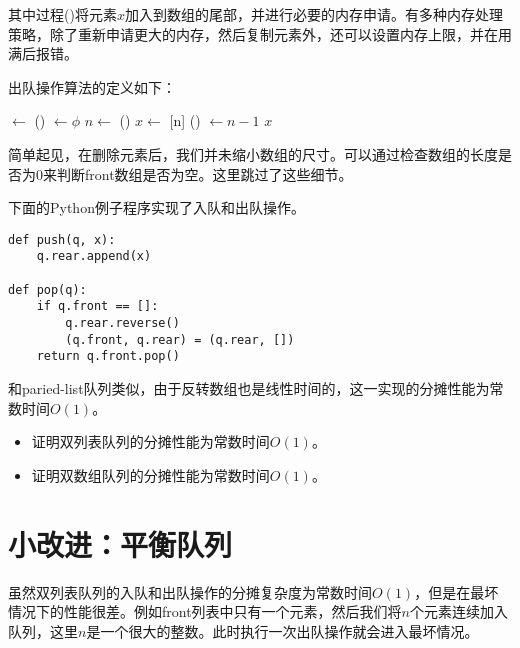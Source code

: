 \documentclass[UTF8]{article}
\begin{document}
其中过程()将元素$x$加入到数组的尾部，并进行必要的内存申请。有多种内存处理策略，除了重新申请更大的内存，然后复制元素外，还可以设置内存上限，并在用满后报错。

出队操作算法的定义如下：

\begin{algorithmic}
    \State {} $\gets$ ()
    \State {} $\gets \phi$
  \EndIf
  \State $n \gets$ ()
  \State $x \gets$ [n]
  \State {}() $\gets n - 1$
  \State \Return $x$
\EndFunction
\end{algorithmic}

简单起见，在删除元素后，我们并未缩小数组的尺寸。可以通过检查数组的长度是否为0来判断front数组是否为空。这里跳过了这些细节。

下面的Python例子程序实现了入队和出队操作。

\begin{lstlisting}
def push(q, x):
    q.rear.append(x)

def pop(q):
    if q.front == []:
        q.rear.reverse()
        (q.front, q.rear) = (q.rear, [])
    return q.front.pop()
\end{lstlisting}

和paried-list队列类似，由于反转数组也是线性时间的，这一实现的分摊性能为常数时间$O(1)$。

\begin{Exercise}
\begin{itemize}
\item 证明双列表队列的分摊性能为常数时间$O(1)$。
\item 证明双数组队列的分摊性能为常数时间$O(1)$。
\end{itemize}
\end{Exercise}

\section{小改进：平衡队列}

虽然双列表队列的入队和出队操作的分摊复杂度为常数时间$O(1)$，但是在最坏情况下的性能很差。例如front列表中只有一个元素，然后我们将$n$个元素连续加入队列，这里$n$是一个很大的整数。此时执行一次出队操作就会进入最坏情况。
\end{document}
